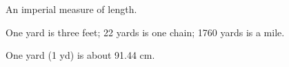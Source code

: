 An imperial measure of length.
\par
One yard is three feet; 22 yards is one chain; 1760 yards is a mile.
\par
One yard (1 yd) is about 91.44 cm.